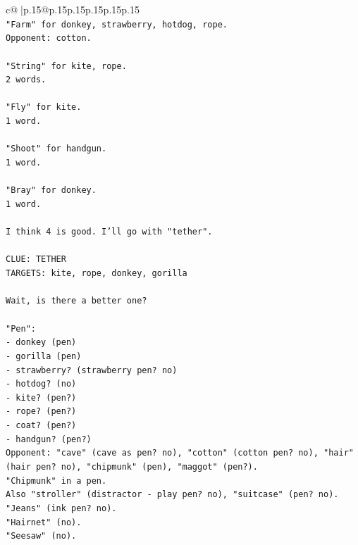 \documentclass{article}
\begin{document}
{\begin{supertabular}{c@{$\;$}|p{.15\linewidth}@{}p{.15\linewidth}p{.15\linewidth}p{.15\linewidth}p{.15\linewidth}p{.15\linewidth}}
{{{\\ 
\texttt{"Farm" for donkey, strawberry, hotdog, rope.} \\
\texttt{Opponent: cotton.} \\
\\ 
\texttt{"String" for kite, rope.} \\
\texttt{2 words.} \\
\\ 
\texttt{"Fly" for kite.} \\
\texttt{1 word.} \\
\\ 
\texttt{"Shoot" for handgun.} \\
\texttt{1 word.} \\
\\ 
\texttt{"Bray" for donkey.} \\
\texttt{1 word.} \\
\\ 
\texttt{I think 4 is good. I'll go with "tether".} \\
\\ 
\texttt{CLUE: TETHER} \\
\texttt{TARGETS: kite, rope, donkey, gorilla} \\
\\ 
\texttt{Wait, is there a better one?} \\
\\ 
\texttt{"Pen":} \\
\texttt{{-} donkey (pen)} \\
\texttt{{-} gorilla (pen)} \\
\texttt{{-} strawberry? (strawberry pen? no)} \\
\texttt{{-} hotdog? (no)} \\
\texttt{{-} kite? (pen?)} \\
\texttt{{-} rope? (pen?)} \\
\texttt{{-} coat? (pen?)} \\
\texttt{{-} handgun? (pen?)} \\
\texttt{Opponent: "cave" (cave as pen? no), "cotton" (cotton pen? no), "hair" (hair pen? no), "chipmunk" (pen), "maggot" (pen?).} \\
\texttt{"Chipmunk" in a pen.} \\
\texttt{Also "stroller" (distractor {-} play pen? no), "suitcase" (pen? no).} \\
\texttt{"Jeans" (ink pen? no).} \\
\texttt{"Hairnet" (no).} \\
\texttt{"Seesaw" (no).} \\
}}}
\end{supertabular}}
\end{document}
